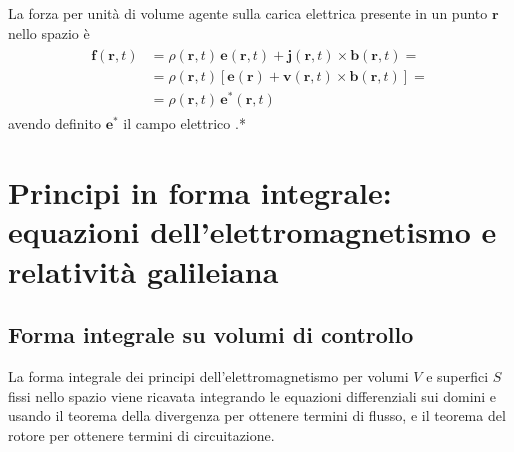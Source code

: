 \documentclass[letterpaper,10pt,english]{jupyterBook}
\begin{document}
\sphinxAtStartPar
{} La forza per unità di volume agente sulla carica elettrica presente in un punto \(\mathbf{r}\) nello spazio è
\begin{equation*}
\begin{split}\begin{aligned}
  \mathbf{f}(\mathbf{r},t) & = \rho(\mathbf{r},t) \, \mathbf{e}(\mathbf{r},t) + \mathbf{j}(\mathbf{r},t) \times \mathbf{b}(\mathbf{r},t) = \\
                           & = \rho(\mathbf{r},t) \left[ \mathbf{e}(\mathbf{r}) + \mathbf{v}(\mathbf{r},t) \times \mathbf{b}(\mathbf{r},t) \right] =  \\
                           & = \rho(\mathbf{r},t) \, \mathbf{e}^*(\mathbf{r},t) 
\end{aligned}\end{split}
\end{equation*}
\sphinxAtStartPar
avendo definito \(\mathbf{e}^*\) il campo elettrico .*


\section{Principi in forma integrale: equazioni dell’elettromagnetismo e relatività galileiana}
\label{\detokenize{ch/principles:principi-in-forma-integrale-equazioni-dell-elettromagnetismo-e-relativita-galileiana}}

\subsection{Forma integrale su volumi di controllo}
\label{\detokenize{ch/principles:forma-integrale-su-volumi-di-controllo}}
\sphinxAtStartPar
La forma integrale dei principi dell’elettromagnetismo per volumi \(V\) e superfici \(S\) fissi nello spazio viene ricavata integrando le equazioni differenziali sui domini e usando il teorema della divergenza per ottenere termini di flusso, e il teorema del rotore per ottenere termini di circuitazione.
\end{document}
